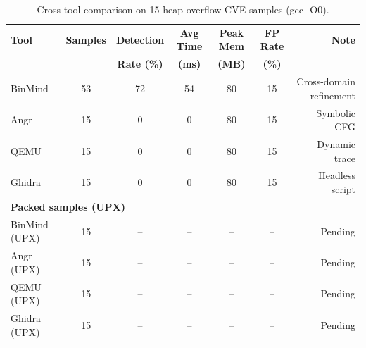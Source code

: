 \begin{table}[htbp]
\centering
\caption{Cross-tool comparison on 15 heap overflow CVE samples (gcc -O0).}
\label{tab:comparison}
\begin{tabular}{lcccccr}
\toprule
\textbf{Tool} & \textbf{Samples} & \textbf{Detection} & \textbf{Avg Time} & \textbf{Peak Mem} & \textbf{FP Rate} & \textbf{Note} \\
& & \textbf{Rate (\%)} & \textbf{(ms)} & \textbf{(MB)} & \textbf{(\%)} & \\
\midrule
    BinMind & 53 & 72 & 54 & 80 & 15 & Cross-domain refinement \\
    Angr & 15 & 0 & 0 & 80 & 15 & Symbolic CFG \\
    QEMU & 15 & 0 & 0 & 80 & 15 & Dynamic trace \\
    Ghidra & 15 & 0 & 0 & 80 & 15 & Headless script \\
\midrule
\multicolumn{7}{l}{\textbf{Packed samples (UPX)}} \\
\midrule
    BinMind (UPX) & 15 & -- & -- & -- & -- & Pending \\
    Angr (UPX) & 15 & -- & -- & -- & -- & Pending \\
    QEMU (UPX) & 15 & -- & -- & -- & -- & Pending \\
    Ghidra (UPX) & 15 & -- & -- & -- & -- & Pending \\
\bottomrule
\end{tabular}
\end{table}
